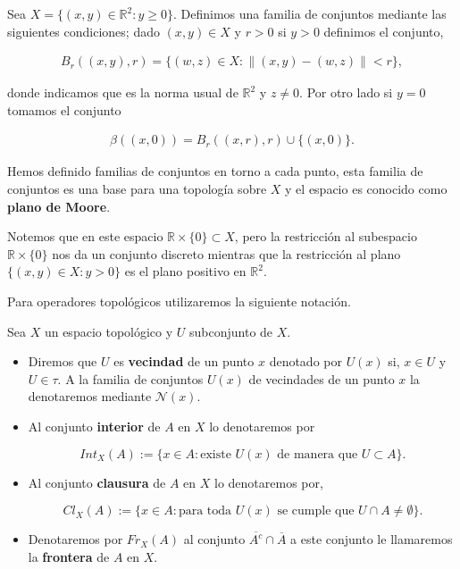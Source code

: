 \begin{ej}
Sea $X= \{(x,y) \in \mathbb{R}^2: y \geq 0 \}$. Definimos una familia de conjuntos mediante las siguientes condiciones; dado $(x,y) \in X$ y $r>0$ si $y > 0$ definimos el conjunto,

\begin{align*}
B_r((x,y),r)=\{(w,z) \in X : \parallel (x,y)-(w,z) \parallel < r \},
\end{align*}

donde indicamos que es la norma usual de $\mathbb{R}^2$ y $z \neq 0$. Por otro lado si $y=0$ tomamos el conjunto 

\begin{align*}
\beta((x,0))=B_r((x,r),r) \cup \{(x,0)\}.
\end{align*}

Hemos definido familias de conjuntos en torno a cada punto, esta familia de conjuntos es una base para una topología sobre $X$ y el espacio es conocido como \textbf{plano de Moore}.

Notemos que en este espacio $\mathbb{R} \times \{0\} \subset X$, pero la restricción al subespacio $\mathbb{R} \times \{0\}$ nos da un conjunto discreto mientras que la restricción al plano $\{(x,y)\in X :y > 0 \}$ es el plano positivo en $\mathbb{R}^2.$
\end{ej}


Para operadores topológicos utilizaremos la siguiente notación. 

\begin{df}
Sea $X$ un espacio topológico y $U$ subconjunto de $X$.

\begin{itemize}
	\item Diremos que $U$ es \textbf{vecindad} de un punto $x$ denotado por $U(x)$ si, $x \in U$ y $U \in \tau$. A la familia de conjuntos $U(x)$ de vecindades de un punto $x$ la denotaremos mediante $\mathcal{N}(x)$.
 
 \item Al conjunto \textbf{interior} de $A$ en $X$ lo denotaremos por 
 
  $$Int_X(A):=\{x \in A: \text{existe } U(x) \text{ de manera que } U \subset A\}.$$
  

 \item  Al conjunto  \textbf{clausura} de $A$ en $X$ lo denotaremos por, 
  
$$Cl_X(A):=\{x \in A: \text{para toda } U(x) \text{ se cumple  que } U \cap A \neq \emptyset\}.$$
 
 \item Denotaremos por  $Fr_X(A)$ al conjunto $\overline{A^c} \cap \overline{A} $ a este conjunto le llamaremos la 
  \textbf{frontera} de $A$ en $X$.
 \end{itemize}
\end{df}

